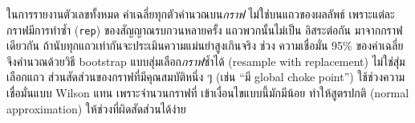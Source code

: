 ในการรายงานตัวเลขทั้งหมด ค่าเฉลี่ยทุกตัวคำนวณบน\emph{กราฟ} ไม่ใช่บนแถวของผลลัพธ์
เพราะแต่ละกราฟมีการทำซ้ำ (\texttt{rep}) ของสัญญาณรบกวนหลายครั้ง แถวพวกนั้นไม่เป็น
อิสระต่อกัน มาจากกราฟเดียวกัน ถ้านับทุกแถวเท่ากันจะประเมินความแม่นยำสูงเกินจริง ช่วง
ความเชื่อมั่น 95\% ของค่าเฉลี่ยจึงคำนวณด้วยวิธี bootstrap แบบสุ่มเลือก\emph{กราฟ}ซ้ำได้
(resample with replacement) ไม่ใช่สุ่มเลือกแถว ส่วนสัดส่วนของกราฟที่มีคุณสมบัติหนึ่ง ๆ
(เช่น ``มี global choke point'') ใช้ช่วงความเชื่อมั่นแบบ Wilson แทน เพราะจำนวนกราฟที่
เข้าเงื่อนไขแบบนี้มักมีน้อย ทำให้สูตรปกติ (normal approximation) ให้ช่วงที่ผิดสัดส่วนได้ง่าย
